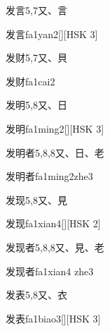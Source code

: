 \begin{entry}{发言}{5,7}{⼜、⾔}
  \begin{phonetics}{发言}{fa1yan2}[][HSK 3]
  \end{phonetics}
\end{entry}

\begin{entry}{发财}{5,7}{⼜、⾙}
  \begin{phonetics}{发财}{fa1cai2}
  \end{phonetics}
\end{entry}

\begin{entry}{发明}{5,8}{⼜、⽇}
  \begin{phonetics}{发明}{fa1ming2}[][HSK 3]
  \end{phonetics}
\end{entry}

\begin{entry}{发明者}{5,8,8}{⼜、⽇、⽼}
  \begin{phonetics}{发明者}{fa1ming2zhe3}
  \end{phonetics}
\end{entry}

\begin{entry}{发现}{5,8}{⼜、⾒}
  \begin{phonetics}{发现}{fa1xian4}[][HSK 2]
  \end{phonetics}
\end{entry}

\begin{entry}{发现者}{5,8,8}{⼜、⾒、⽼}
  \begin{phonetics}{发现者}{fa1xian4 zhe3}
  \end{phonetics}
\end{entry}

\begin{entry}{发表}{5,8}{⼜、⾐}
  \begin{phonetics}{发表}{fa1biao3}[][HSK 3]
  \end{phonetics}
\end{entry}

